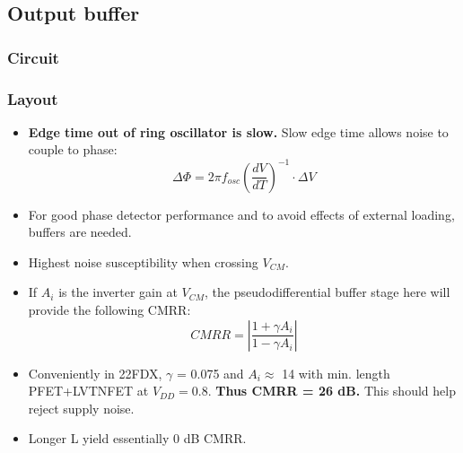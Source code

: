 	\FloatBarrier
	\subsection{Output buffer}
		\subsubsection{Circuit}
		\subsubsection{Layout}


			\begin{itemize}[itemsep=4pt,label=\protect---]
				\item \textbf{Edge time out of ring oscillator is slow.} Slow edge time allows noise to couple to phase:
				\begin{equation}
					\Delta \Phi = 2\pi f_{osc}\left(\frac{dV}{dT}\right)^{-1}\cdot\Delta V
				\end{equation}
				\item For good phase detector performance and to avoid effects of external loading, buffers are needed.
				\item Highest noise susceptibility when crossing $V_{CM}$.
				\item If $A_i$ is the inverter gain at $V_{CM}$, the pseudodifferential buffer stage here will provide the following CMRR:
				\begin{equation}
				CMRR = \left|\frac{1+\gamma A_i}{1-\gamma A_i}\right|
				\end{equation}
				\item Conveniently in 22FDX, $\gamma$ = 0.075 and $A_i \approx$ 14 with min. length PFET+LVTNFET at $V_{DD}=0.8$. \textbf{Thus CMRR = 26 dB.} This should help reject supply noise.
				\item Longer L yield essentially 0 dB CMRR. 

			\end{itemize}

